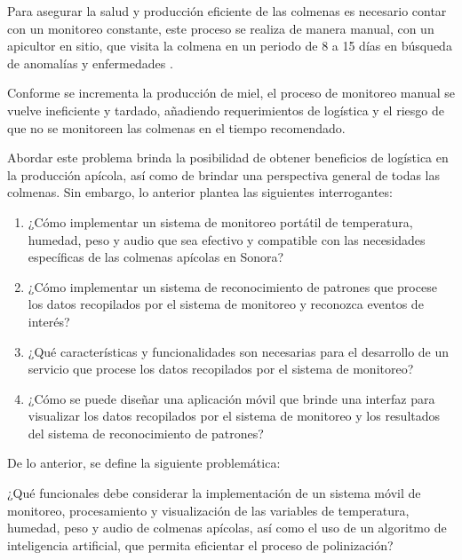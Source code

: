 Para asegurar la salud y producción eficiente de las colmenas es necesario contar con un monitoreo constante, este proceso se realiza de manera manual, con un apicultor en sitio, que visita la colmena en un periodo de 8 a 15 días en búsqueda de anomalías y enfermedades \cite{correa_benitez_2018}.

Conforme se incrementa la producción de miel, el proceso de monitoreo manual se vuelve ineficiente y tardado, añadiendo requerimientos de logística y el riesgo de que no se monitoreen las colmenas en el tiempo recomendado.

Abordar este problema brinda la posibilidad de obtener beneficios de logística en la producción apícola, así como de brindar una perspectiva general de todas las colmenas. Sin embargo, lo anterior plantea las siguientes interrogantes:

\begin{enumerate}
    \item ¿Cómo implementar un sistema de monitoreo portátil de temperatura, humedad, peso y audio que sea efectivo y compatible con las necesidades específicas de las colmenas apícolas en Sonora?
    \item ¿Cómo implementar un sistema de reconocimiento de patrones que procese los datos recopilados por el sistema de monitoreo y reconozca eventos de interés?
    \item ¿Qué características y funcionalidades son necesarias para el desarrollo de un servicio que procese los datos recopilados por el sistema de monitoreo?
    \item ¿Cómo se puede diseñar una aplicación móvil que brinde una interfaz para visualizar los datos recopilados por el sistema de monitoreo y los resultados del sistema de reconocimiento de patrones?
\end{enumerate}

De lo anterior, se define la siguiente problemática:

¿Qué funcionales debe considerar la implementación de un sistema móvil de monitoreo, procesamiento y visualización de las variables de temperatura, humedad, peso y audio de colmenas apícolas, así como el uso de un algoritmo de inteligencia artificial, que permita eficientar el proceso de polinización?